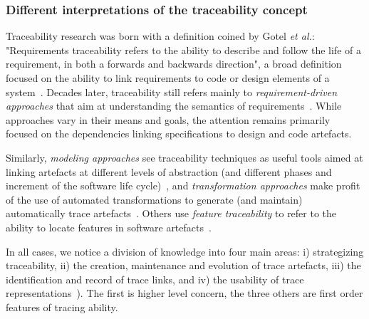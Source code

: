 \subsubsection{Different interpretations of the traceability concept}
Traceability research was born with a definition coined by Gotel \textit{et al.}: "Requirements  traceability  refers  to  the  ability  to  describe and  follow  the life of a requirement, in both a forwards  and backwards direction", a broad definition focused on the ability to link requirements to code or design elements of a system~\cite{gotel1994}. Decades later, traceability still refers mainly to \textit{requirement-driven approaches} that aim at understanding the semantics of requirements~\cite{bouillon2013-survey-on-usage-scenario-requirements-traceability-in-practice,badreddin2014-req-traceability-model-based-approach}. %
While approaches vary in their means and goals, the attention remains primarily focused on the dependencies linking specifications to design and code artefacts.

Similarly, \textit{modeling approaches} see traceability techniques as useful tools aimed at linking artefacts at different levels of abstraction (and different phases and increment of the software life cycle)~\cite{mader2007-tracing-unified-process,tekinerdogan2007-metamodel-for-tracing-concers-accross-life-cycle}, and \textit{transformation approaches} make profit of the use of automated transformations to generate (and maintain) automatically trace artefacts~\cite{galvao2007-survey-traceability-in-MDE}. Others use \textit{feature traceability} to refer to the ability to locate features in software artefacts~\cite{meinicke2017-feature-traceability}.

In all cases, we notice a division of knowledge into four main areas: i) strategizing traceability, ii) the creation, maintenance and evolution of trace artefacts, iii) the identification and record of trace links, and iv) the usability of trace representations~\cite{winkler2010-survey-traceability-and-MDE,antoniol2017-traceability-grand-challenges}). The first is higher level concern, the three others are first order features of tracing ability.

